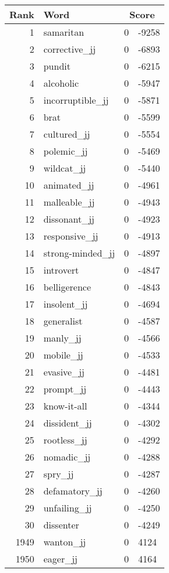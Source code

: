 \begin{longtable}[!htbp]{| rlr@{.}l |}
    \hline
    \textbf{Rank} & \textbf{Word} & \multicolumn{2}{c|}{\textbf{Score}} \\
    \hline
    \endhead
    1 & samaritan & 0 & -9258 \\
    2 & corrective\_jj & 0 & -6893 \\
    3 & pundit & 0 & -6215 \\
    4 & alcoholic & 0 & -5947 \\
    5 & incorruptible\_jj & 0 & -5871 \\
    6 & brat & 0 & -5599 \\
    7 & cultured\_jj & 0 & -5554 \\
    8 & polemic\_jj & 0 & -5469 \\
    9 & wildcat\_jj & 0 & -5440 \\
    10 & animated\_jj & 0 & -4961 \\
    11 & malleable\_jj & 0 & -4943 \\
    12 & dissonant\_jj & 0 & -4923 \\
    13 & responsive\_jj & 0 & -4913 \\
    14 & strong-minded\_jj & 0 & -4897 \\
    15 & introvert & 0 & -4847 \\
    16 & belligerence & 0 & -4843 \\
    17 & insolent\_jj & 0 & -4694 \\
    18 & generalist & 0 & -4587 \\
    19 & manly\_jj & 0 & -4566 \\
    20 & mobile\_jj & 0 & -4533 \\
    21 & evasive\_jj & 0 & -4481 \\
    22 & prompt\_jj & 0 & -4443 \\
    23 & know-it-all & 0 & -4344 \\
    24 & dissident\_jj & 0 & -4302 \\
    25 & rootless\_jj & 0 & -4292 \\
    26 & nomadic\_jj & 0 & -4288 \\
    27 & spry\_jj & 0 & -4287 \\
    28 & defamatory\_jj & 0 & -4260 \\
    29 & unfailing\_jj & 0 & -4250 \\
    30 & dissenter & 0 & -4249 \\
    1949 & wanton\_jj & 0 & 4124 \\
    1950 & eager\_jj & 0 & 4164 \\

\end{longtable}

